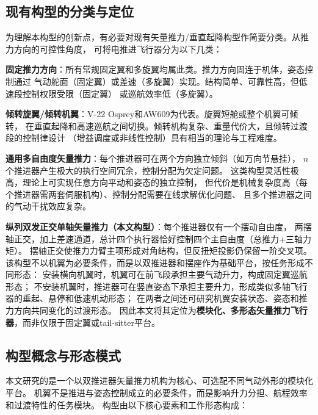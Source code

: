 \subsection{现有构型的分类与定位}

为理解本构型的创新点，有必要对现有矢量推力/垂直起降构型作简要分类。从推力方向的可控性角度，
可将电推进飞行器分为以下几类：

\textbf{固定推力方向}：所有常规固定翼和多旋翼均属此类。推力方向固连于机体，姿态控制通过
气动舵面（固定翼）或差速（多旋翼）实现。结构简单、可靠性高，但低速段控制权限受限（固定翼）
或巡航效率低（多旋翼）。

\textbf{倾转旋翼/倾转机翼}：V-22 Osprey和AW609为代表。旋翼短舱或整个机翼可倾转，
在垂直起降和高速巡航之间切换。倾转机构复杂、重量代价大，且倾转过渡段的控制律设计
（增益调度或非线性控制）具有相当的理论与工程难度\cite{kang2009control}。

\textbf{通用多自由度矢量推力}：每个推进器可在两个方向独立倾斜（如万向节悬挂），
$n$个推进器产生极大的执行空间冗余，控制分配为欠定问题\cite{seguigasco2014novel}。
这类构型灵活性极高，理论上可实现任意方向平动和姿态的独立控制，
但代价是机械复杂度高（每个推进器需两套伺服机构）、控制分配需要在线求解优化问题、
且多个推进器之间的气动干扰效应复杂\cite{zhu2025experimental}。

\textbf{纵列双发正交单轴矢量推力（本文构型）}：每个推进器仅有一个摆动自由度，
两摆轴正交，加上差速通道，总计四个执行器恰好控制四个主自由度（总推力+三轴力矩）。
摆轴正交使推力力臂主项形成对角结构，但反扭矩投影仍保留一阶交叉项。
该构型不以机翼为必要条件，而是以双推进器和摆座作为基础平台，按任务形成不同形态：
安装横向机翼时，机翼可在前飞段承担主要气动升力，构成固定翼巡航形态；
不安装机翼时，推进器可在竖直姿态下承担主要升力，形成类似多轴飞行器的垂起、悬停和低速机动形态；
在两者之间还可研究机翼安装状态、姿态和推力方向共同变化的过渡形态。
因此本文将其定位为\textbf{模块化、多形态矢量推力飞行器}，而非仅限于固定翼或tail-sitter平台。

\subsection{构型概念与形态模式}
\label{sec:configuration_modes}

本文研究的是一个以双推进器矢量推力机构为核心、可选配不同气动外形的模块化平台。
机翼不是推进与姿态控制成立的必要条件，而是影响升力分担、航程效率和过渡特性的任务模块。
构型由以下核心要素和工作形态构成：

